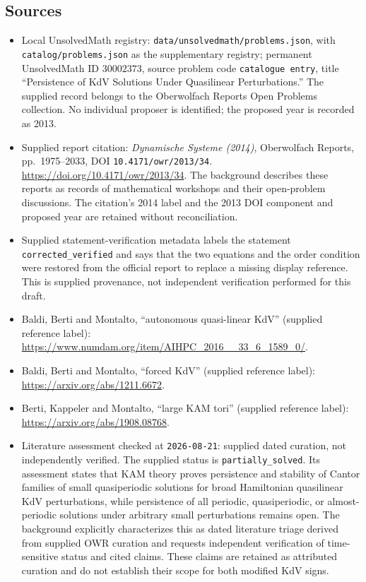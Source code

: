 \documentclass[11pt]{article}
\begin{document}
\subsection{Sources}
\begin{itemize}
\item Local UnsolvedMath registry: \texttt{data/unsolvedmath/problems.json}, with \texttt{catalog/problems.json} as the supplementary registry; permanent UnsolvedMath ID \(30002373\), source problem code \texttt{catalogue entry}, title ``Persistence of KdV Solutions Under Quasilinear Perturbations.'' The supplied record belongs to the Oberwolfach Reports Open Problems collection. No individual proposer is identified; the proposed year is recorded as 2013.
\item Supplied report citation: \emph{Dynamische Systeme (2014)}, Oberwolfach Reports, pp.\ 1975--2033, DOI \texttt{10.4171/owr/2013/34}. \url{https://doi.org/10.4171/owr/2013/34}. The background describes these reports as records of mathematical workshops and their open-problem discussions. The citation's 2014 label and the 2013 DOI component and proposed year are retained without reconciliation.
\item Supplied statement-verification metadata labels the statement \texttt{corrected\_verified} and says that the two equations and the order condition were restored from the official report to replace a missing display reference. This is supplied provenance, not independent verification performed for this draft.
\item Baldi, Berti and Montalto, ``autonomous quasi-linear KdV'' (supplied reference label): \url{https://www.numdam.org/item/AIHPC_2016__33_6_1589_0/}.
\item Baldi, Berti and Montalto, ``forced KdV'' (supplied reference label): \url{https://arxiv.org/abs/1211.6672}.
\item Berti, Kappeler and Montalto, ``large KAM tori'' (supplied reference label): \url{https://arxiv.org/abs/1908.08768}.
\item Literature assessment checked at \texttt{2026-08-21}: supplied dated curation, not independently verified. The supplied status is \texttt{partially\_solved}. Its assessment states that KAM theory proves persistence and stability of Cantor families of small quasiperiodic solutions for broad Hamiltonian quasilinear KdV perturbations, while persistence of all periodic, quasiperiodic, or almost-periodic solutions under arbitrary small perturbations remains open. The background explicitly characterizes this as dated literature triage derived from supplied OWR curation and requests independent verification of time-sensitive status and cited claims. These claims are retained as attributed curation and do not establish their scope for both modified KdV signs.
\end{itemize}
\end{document}
